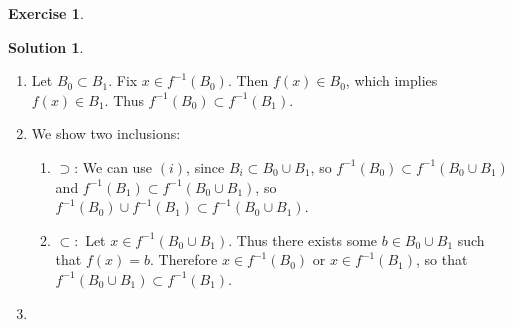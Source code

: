 \documentclass[11pt]{article}
\numberwithin{equation}{section}
\theoremstyle{plain}
\theoremstyle{definition}
\newtheorem*{solution}{\color{Goldenrod}Solution}
\newtheorem{exercise}{\color{YellowOrange}Exercise}[section]
\newcommand\inv[1]{#1^{-1}}
\def\ss{\subset}
\newcommand{\1}{\mathbbm 1}
\begin{document}
\begin{exercise}

\end{exercise}
\begin{solution}
\begin{enumerate}
	\item Let $B_0 \subset B_1$. Fix $x \in \inv{f}(B_0)$. Then $f(x) \in B_0$, which implies $f(x) \in B_1$. Thus $\inv{f}(B_0) \ss \inv{f}(B_1)$. 
	\item We show two inclusions:
	\begin{enumerate}
	 	\item $\supset$: We can use $(i)$, since $B_i \subset B_0 \cup B_1$, so $\inv{f}(B_0) \ss \inv{f}(B_0 \cup B_1)$ and $\inv{f}(B_1) \ss \inv{f}(B_0 \cup B_1)$, so $\inv{f}(B_0) \cup \inv{f}(B_1) \ss \inv{f}(B_0 \cup B_1)$.
	 	\item $\ss:$ Let $x \in \inv{f}(B_0 \cup B_1)$. Thus there exists some $b \in B_0 \cup B_1$ such that $f(x) = b$. Therefore $x \in \inv{f}(B_0)$ or $x \in \inv{f}(B_1)$, so that $\inv{f}(B_0 \cup B_1) \ss \inv{f}(B_1)$.
	 \end{enumerate}
	 \item  
\end{enumerate}
\end{solution}
\end{document}
